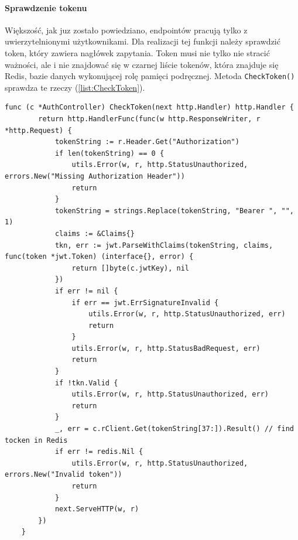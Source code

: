 \paragraph{Sprawdzenie tokenu\newline}
Większość, jak juz zostało powiedziano, endpointów pracują tylko z uwierzytelnionymi użytkownikami. Dla realizacji tej funkcji należy sprawdzić token, który zawiera nagłówek zapytania.
Token musi nie tylko nie stracić ważności, ale i nie znajdować się w czarnej liście tokenów, która znajduje się Redis, bazie danych wykonującej rolę pamięci podręcznej.
Metoda \texttt{CheckToken()} sprawdza te rzeczy (\ref{list:CheckToken}).
\begin{lstlisting}[label=list:CheckToken,caption=Walidacja JWT tokenu,basicstyle=\tiny\ttfamily]
    func (c *AuthController) CheckToken(next http.Handler) http.Handler {
        return http.HandlerFunc(func(w http.ResponseWriter, r *http.Request) {
            tokenString := r.Header.Get("Authorization")
            if len(tokenString) == 0 {
                utils.Error(w, r, http.StatusUnauthorized, errors.New("Missing Authorization Header"))
                return
            }
            tokenString = strings.Replace(tokenString, "Bearer ", "", 1)
            claims := &Claims{}
            tkn, err := jwt.ParseWithClaims(tokenString, claims, func(token *jwt.Token) (interface{}, error) {
                return []byte(c.jwtKey), nil
            })
            if err != nil {
                if err == jwt.ErrSignatureInvalid {
                    utils.Error(w, r, http.StatusUnauthorized, err)
                    return
                }
                utils.Error(w, r, http.StatusBadRequest, err)
                return
            }
            if !tkn.Valid {
                utils.Error(w, r, http.StatusUnauthorized, err)
                return
            }
            _, err = c.rClient.Get(tokenString[37:]).Result() // find tocken in Redis
            if err != redis.Nil {
                utils.Error(w, r, http.StatusUnauthorized, errors.New("Invalid token"))
                return
            }
            next.ServeHTTP(w, r)
        })
    }
\end{lstlisting}


